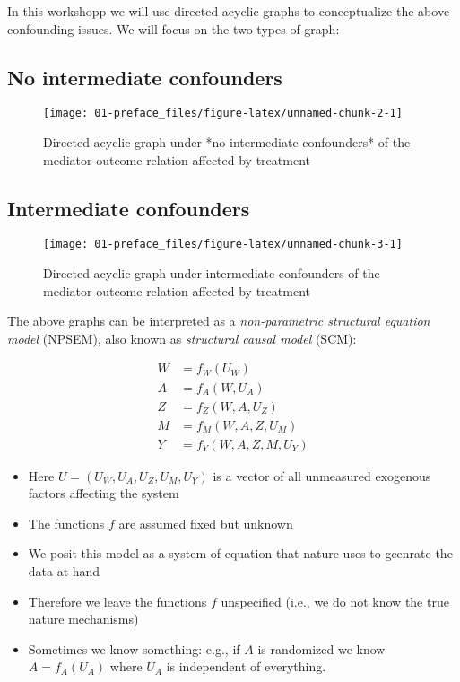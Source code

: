 \documentclass[
  12pt,
]{book}
\providecommand{\tightlist}{%
  \setlength{\itemsep}{0pt}\setlength{\parskip}{0pt}}
\theoremstyle{definition}
\theoremstyle{definition}
\theoremstyle{definition}
\newcommand{\1}{\mathbbm{1}}
\begin{document}
In this workshopp we will use directed acyclic graphs to conceptualize the above
confounding issues. We will focus on the two types of graph:

\hypertarget{no-intermediate-confounders}{%
\subsection{No intermediate confounders}\label{no-intermediate-confounders}}

\begin{figure}

{\centering \texttt{[image: 01-preface\_files/figure-latex/unnamed-chunk-2-1]} 

}

\caption{Directed acyclic graph under *no intermediate confounders* of the mediator-outcome relation affected by treatment}\label{fig:unnamed-chunk-2}
\end{figure}

\hypertarget{intermediate-confounders}{%
\subsection{Intermediate confounders}\label{intermediate-confounders}}

\begin{figure}

{\centering \texttt{[image: 01-preface\_files/figure-latex/unnamed-chunk-3-1]} 

}

\caption{Directed acyclic graph under intermediate confounders of the mediator-outcome relation affected by treatment}\label{fig:unnamed-chunk-3}
\end{figure}

The above graphs can be interpreted as a \emph{non-parametric structural equation model}
(NPSEM), also known as \emph{structural causal model} (SCM):

\begin{align}
  W & = f_W(U_W)\\
  A & = f_A(W, U_A)\\
  Z & = f_Z(W, A, U_Z)\\
  M & = f_M(W, A, Z, U_M)\\
  Y & = f_Y(W, A, Z, M, U_Y)
\end{align}

\begin{itemize}
\tightlist
\item
  Here \(U=(U_W, U_A, U_Z, U_M, U_Y)\) is a vector of all unmeasured exogenous
  factors affecting the system
\item
  The functions \(f\) are assumed fixed but unknown
\item
  We posit this model as a system of equation that nature uses to geenrate the
  data at hand
\item
  Therefore we leave the functions \(f\) unspecified (i.e., we do not know the
  true nature mechanisms)
\item
  Sometimes we know something: e.g., if \(A\) is randomized we know \(A=f_A(U_A)\)
  where \(U_A\) is independent of everything.
\end{itemize}
\end{document}
